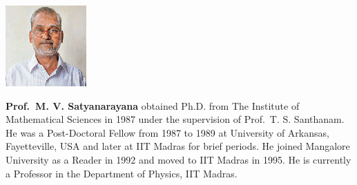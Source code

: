 \centerline{\includegraphics[scale=2.5]{authorsphotos/Prof_M_V_Satyanarayana.eps}}
\bigskip

\noindent
\textbf{Prof.\ M. V. Satyanarayana} obtained Ph.D. from The Institute of Mathematical Sciences in 1987 under the supervision of Prof.\ T. S. Santhanam. He was a Post-Doctoral Fellow from 1987 to 1989 at University of Arkansas, Fayetteville, USA and later at IIT Madras for brief periods. He joined Mangalore University as a Reader in 1992 and moved to IIT Madras in 1995. He is currently a Professor in the Department of Physics, IIT Madras.
